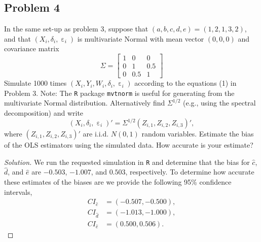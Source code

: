 \documentclass{amsart}
\DeclareMathOperator{\ep}{\varepsilon}
\begin{document}
		\subsection*{Problem 4} %
		\label{sub:problem_4}
			In the same set-up as problem 3, suppose that $(a,b,c,d,e) = (1, 2, 1, 3, 2)$, and that $(X_{i}, \delta_{i}, \ep_{i})$ is multivariate Normal with mean vector $(0, 0, 0)$ and covariance matrix $$\Sigma = \begin{bmatrix}
				1 & 0 & 0 \\
				0 & 1 & 0.5 \\
				0 & 0.5 & 1
			\end{bmatrix}$$
			Simulate 1000 times $(X_{i}, Y_{i}, W_{i}, \delta_{i}, \ep_{i})$ according to the equations (1) in Problem 3.
			Note: The \verb|R| package \verb|mvtnorm| is useful for generating from the multivariate Normal distribution. 
			Alternatively find $\Sigma^{1/2}$ (e.g., using the spectral decomposition) and write $$(X_{i},\delta_{i},\ep_{i})' = \Sigma^{1/2} (Z_{i,1}, Z_{i,2}, Z_{i,3})',$$ where $(Z_{i,1}, Z_{i,2}, Z_{i,3})'$ are i.i.d. $N(0,1)$ random variables.
			Estimate the bias of the OLS estimators using the simulated data. 
			How accurate is your estimate?
			\begin{proof}[Solution] We run the requested simulation in \verb|R| and determine that the bias for $\hat{c}$, $\hat{d}$, and $\hat{e}$ are $-0.503$, $-1.007$, and $0.503$, respectively.
			To determine how accurate these estimates of the biases are we provide the following 95\% confidence intervals,
				\begin{align*}
					CI_{\hat{c}} &= (-0.507, -0.500), \\
					CI_{\hat{d}} &= (-1.013, -1.000), \\
					CI_{\hat{e}} &= (0.500, 0.506).
				\end{align*}
			\end{proof}
\end{document}
